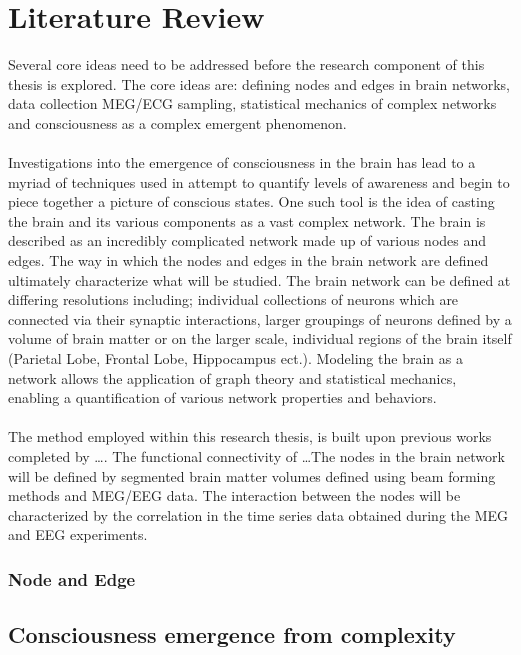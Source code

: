 \documentclass{article}
\begin{document}
\section{Literature Review}
Several core ideas need to be addressed before the research component of this thesis is explored. The core ideas are: defining nodes and edges in brain networks, data collection MEG/ECG sampling, statistical mechanics of complex networks and consciousness as a complex emergent phenomenon.\\
\\
Investigations into the emergence of consciousness in the brain has lead to a myriad of techniques used in attempt to quantify levels of awareness and begin to piece together a picture of conscious states. One such tool is the idea of casting the brain and its various components as a vast complex network. The brain is described as an incredibly complicated network made up of various nodes and edges. The way in which the nodes and edges in the brain network are defined ultimately characterize what will be studied. The brain network can be defined at differing resolutions including; individual collections of neurons which are connected via their synaptic interactions, larger groupings of neurons defined by a volume of brain matter or on the larger scale, individual regions of the brain itself (Parietal Lobe, Frontal Lobe, Hippocampus ect.). Modeling the brain as a network allows the application of graph theory and statistical mechanics, enabling a quantification of various network properties and behaviors.\\
\\
The method employed within this research thesis, is built upon previous works completed by \dots. The functional connectivity of \dots The nodes in the brain network will be defined by segmented brain matter volumes defined using beam forming methods and MEG/EEG data. The interaction between the nodes will be characterized by the correlation in the time series data obtained during the MEG and EEG experiments.

\subsubsection*{Node and Edge}


\subsection{Consciousness emergence from complexity}
\end{document}
